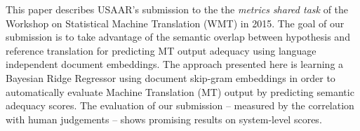 This paper describes USAAR's submission to the the {\itshape metrics shared task} of the Workshop on Statistical Machine Translation (WMT) in 2015. The goal of our submission is to take advantage of the semantic overlap between hypothesis and reference translation for predicting MT output adequacy using language independent document embeddings. The approach presented here is learning a Bayesian Ridge Regressor using document skip-gram embeddings in order to automatically evaluate Machine Translation (MT) output by predicting semantic adequacy scores. The evaluation of our submission -- measured by the correlation with human judgements -- shows promising results on system-level scores.
